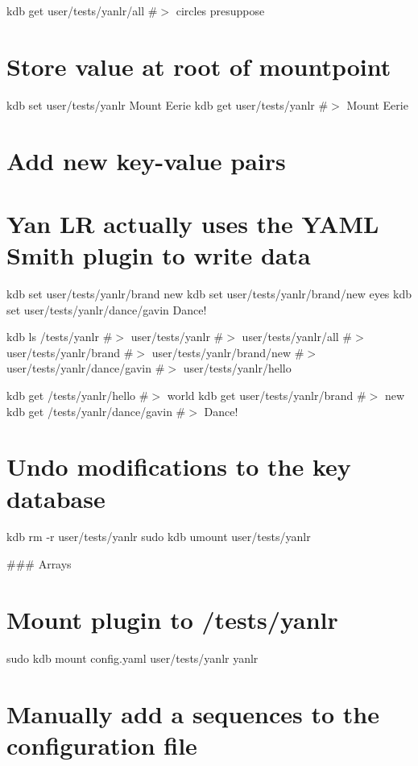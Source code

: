 kdb get user/tests/yanlr/all \#$>$ circles presuppose

\section*{Store value at root of mountpoint}

kdb set user/tests/yanlr \textquotesingle{}Mount Eerie\textquotesingle{} kdb get user/tests/yanlr \#$>$ Mount Eerie

\section*{Add new key-\/value pairs}

\section*{Yan LR actually uses the Y\+A\+ML Smith plugin to write data}

kdb set user/tests/yanlr/brand new kdb set user/tests/yanlr/brand/new eyes kdb set user/tests/yanlr/dance/gavin \textquotesingle{}Dance!\textquotesingle{}

kdb ls /tests/yanlr \#$>$ user/tests/yanlr \#$>$ user/tests/yanlr/all \#$>$ user/tests/yanlr/brand \#$>$ user/tests/yanlr/brand/new \#$>$ user/tests/yanlr/dance/gavin \#$>$ user/tests/yanlr/hello

kdb get /tests/yanlr/hello \#$>$ world kdb get user/tests/yanlr/brand \#$>$ new kdb get /tests/yanlr/dance/gavin \#$>$ Dance!

\section*{Undo modifications to the key database}

kdb rm -\/r user/tests/yanlr sudo kdb umount user/tests/yanlr 
\begin{DoxyCode}
### Arrays
\end{DoxyCode}
 \section*{Mount plugin to {\ttfamily /tests/yanlr}}

sudo kdb mount config.\+yaml user/tests/yanlr yanlr

\section*{Manually add a sequences to the configuration file}


